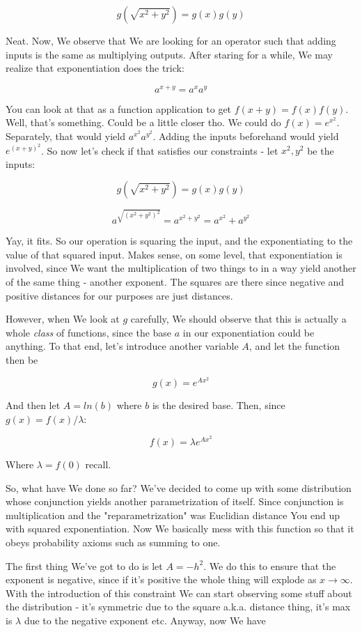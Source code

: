 \documentclass{article}
\begin{document}
		\[ g(\sqrt{x^2+y^2}) = g(x)g(y) \]
		
		Neat. Now, We observe that We are looking for an operator such that adding inputs is the same as multiplying outputs. After staring for a while, We may realize that exponentiation does the trick:
		
		\[ a^{x+y} = a^xa^y  \]
		  		
		You can look at that as a function application to get $f(x+y) = f(x)f(y)$. Well, that's something. Could be a little closer  tho. We could do $f(x) = e^{x^2}$. Separately, that would yield $a^{x^2}a^{y^2}$. Adding the inputs beforehand would yield $e^{(x+y)^2}$. So now let's check if that satisfies our constraints - let $x^2, y^2$ be the inputs: 
		
		\[ g(\sqrt{x^2+y^2}) = g(x)g(y) \]
		
		\[ a^{\sqrt{(x^2+y^2)^2}} = a^{x^2+y^2} = a^{x^2}+a^{y^2} \]
		
		Yay, it fits. So our operation is squaring the input, and the exponentiating to the value of that squared input. Makes sense, on some level, that exponentiation is involved, since We want the multiplication of two things to in a way yield another of the same thing - another exponent. The squares are there since negative and positive distances for our purposes are just distances.
		
		However, when We look at $g$ carefully, We should observe that this is actually a whole \textit{class} of functions, since the base $a$ in our exponentiation could be anything. To that end, let's introduce another variable $A$, and let the function then be
		
		\[ g(x) = e^{Ax^2} \]
		
		And then let $A = ln(b)$ where $b$ is the desired base. Then, since $g(x) =f(x)/\lambda$:
		
		\[ f(x) = \lambda e^{Ax^2} \] 
		
		Where $\lambda = f(0)$ recall.
		
		So, what have We done so far? We've decided to come up with some distribution whose conjunction yields another parametrization of itself. Since conjunction is multiplication and the "reparametrization" was Euclidian distance You end up with squared exponentiation. Now We basically mess with this function so that it obeys probability axioms such as summing to one. 
		
		The first thing We've got to do is let $A = -h^2$. We do this to ensure that the exponent is negative, since if it's positive the whole thing will explode as $x\to\infty$. With the introduction of this constraint We can start observing some stuff about the distribution - it's symmetric due to the square a.k.a. distance thing, it's max is $\lambda$ due to the negative exponent etc. Anyway, now We have
		
\end{document}
